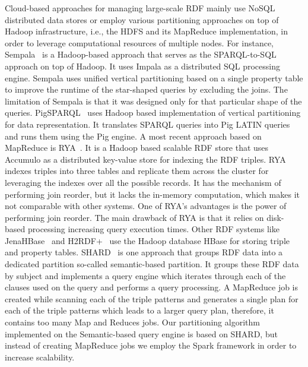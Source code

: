 Cloud-based approaches for managing large-scale \gls{RDF} mainly use NoSQL distributed data stores or employ various partitioning approaches on top of Hadoop infrastructure, i.e., the \gls{HDFS} and its MapReduce implementation, in order to leverage computational resources of multiple nodes. 
For instance, Sempala~\cite{Schatzle2014Sempala} is a Hadoop-based approach that serves as the SPARQL-to-SQL approach on top of Hadoop.
It uses Impala as a distributed SQL processing engine.
Sempala uses unified vertical partitioning based on a single property table to improve the runtime of the star-shaped queries by excluding the joins. 
The limitation of Sempala is that it was designed only for that particular shape of the queries.
PigSPARQL~\cite{Schatzle2011PMS} uses Hadoop based implementation of vertical partitioning for data representation. 
It translates \gls{SPARQL} queries into Pig LATIN queries and runs them using the Pig engine.
A most recent approach based on MapReduce is RYA~\cite{Punnoose2012Rya}.
It is a Hadoop based scalable \gls{RDF} store that uses Accumulo as a distributed key-value store for indexing the \gls{RDF} triples.
RYA indexes triples into three tables and replicate them across the cluster for leveraging the indexes over all the possible records.
It has the mechanism of performing join reorder, but it lacks the in-memory computation, which makes it not comparable with other systems.
One of RYA's advantages is the power of performing join reorder. 
The main drawback of RYA is that it relies on disk-based processing increasing query execution times.
Other \gls{RDF} systems like JenaHBase~\cite{KhadilkarKTC2012} and H2RDF+~\cite{PapailiouKTKK13} use the Hadoop database HBase for storing triple and property tables.
SHARD~\cite{Rohloff2010SHARD} is one approach that groups \gls{RDF} data into a dedicated partition so-called semantic-based partition.  
It groups these \gls{RDF} data by subject and implements a query engine which iterates through each of the clauses used on the query and performs a query processing. 
A MapReduce job is created while scanning each of the triple patterns and generates a single plan for each of the triple patterns which leads to a larger query plan, therefore, it contains too many Map and Reduces jobs. 
Our partitioning algorithm implemented on the Semantic-based query engine is based on SHARD, but instead of creating MapReduce jobs we employ the Spark framework in order to increase scalability.

